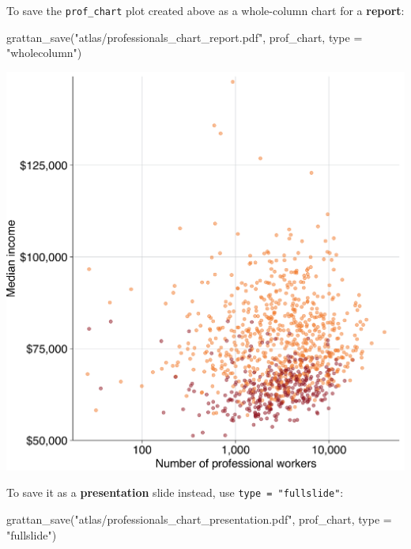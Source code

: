 \documentclass[
]{book}
\newenvironment{Shaded}{\begin{snugshade}}{\end{snugshade}}
\newcommand{\AttributeTok}[1]{\textcolor[rgb]{0.77,0.63,0.00}{#1}}
\newcommand{\FunctionTok}[1]{\textcolor[rgb]{0.00,0.00,0.00}{#1}}
\newcommand{\NormalTok}[1]{#1}
\newcommand{\StringTok}[1]{\textcolor[rgb]{0.31,0.60,0.02}{#1}}
\begin{document}
To save the \texttt{prof\_chart} plot created above as a whole-column chart for a \textbf{report}:

\begin{Shaded}
\begin{Highlighting}[]
\FunctionTok{grattan\_save}\NormalTok{(}\StringTok{"atlas/professionals\_chart\_report.pdf"}\NormalTok{, prof\_chart, }\AttributeTok{type =} \StringTok{"wholecolumn"}\NormalTok{)}
\end{Highlighting}
\end{Shaded}

\includegraphics{atlas/professionals_chart_report.png}

To save it as a \textbf{presentation} slide instead, use \texttt{type\ =\ "fullslide"}:

\begin{Shaded}
\begin{Highlighting}[]
\FunctionTok{grattan\_save}\NormalTok{(}\StringTok{"atlas/professionals\_chart\_presentation.pdf"}\NormalTok{, prof\_chart, }\AttributeTok{type =} \StringTok{"fullslide"}\NormalTok{)}
\end{Highlighting}
\end{Shaded}
\end{document}
